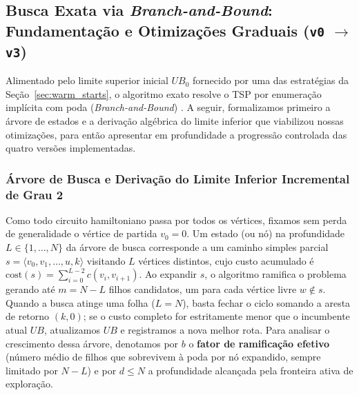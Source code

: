 \subsection{Busca Exata via \textit{Branch-and-Bound}: Fundamentação e Otimizações Graduais (\texttt{v0} \texorpdfstring{$\rightarrow$}{->} \texttt{v3})}
\label{sec:bnb_otimizacoes}

Alimentado pelo limite superior inicial $UB_0$ fornecido por uma das estratégias da
Seção~\ref{sec:warm_starts}, o algoritmo exato resolve o TSP por enumeração implícita com poda
(\textit{Branch-and-Bound}) \cite{levitin2012design}. A seguir, formalizamos primeiro a árvore
de estados e a derivação algébrica do limite inferior que viabilizou nossas otimizações, para
então apresentar em profundidade a progressão controlada das quatro versões implementadas.

\subsubsection{Árvore de Busca e Derivação do Limite Inferior Incremental de Grau 2}
\label{sec:bnb_bound}

Como todo circuito hamiltoniano passa por todos os vértices, fixamos sem perda de generalidade
o vértice de partida $v_0 = 0$. Um estado (ou nó) na profundidade $L \in \{1, \dots, N\}$ da
árvore de busca corresponde a um caminho simples parcial
$s = \langle v_0, v_1, \dots, u, k \rangle$ visitando $L$ vértices distintos, cujo custo
acumulado é $\text{cost}(s) = \sum_{i=0}^{L-2} c(v_i, v_{i+1})$. Ao expandir $s$, o algoritmo
ramifica o problema gerando até $m = N - L$ filhos candidatos, um para cada vértice livre
$w \notin s$. Quando a busca atinge uma folha ($L = N$), basta fechar o ciclo somando a aresta
de retorno $(k, 0)$; se o custo completo for estritamente menor que o incumbente atual $UB$,
atualizamos $UB$ e registramos a nova melhor rota. Para analisar o crescimento dessa árvore,
denotamos por $b$ o \textbf{fator de ramificação efetivo} (número médio de filhos que
sobrevivem à poda por nó expandido, sempre limitado por $N - L$) e por $d \le N$ a profundidade
alcançada pela fronteira ativa de exploração.

